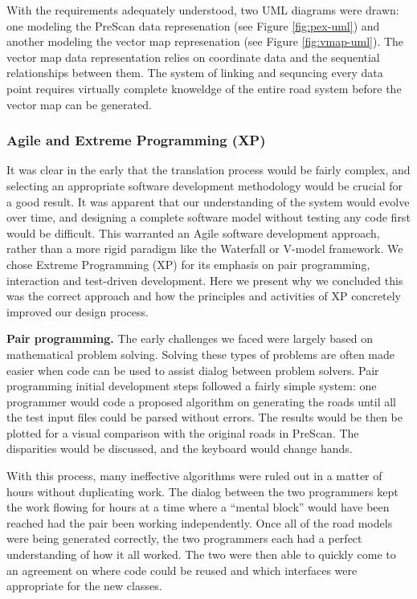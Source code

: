 \documentclass[12pt,twoside]{article}
\begin{document}
With the requirements adequately understood, two UML diagrams were drawn: one modeling the PreScan data represenation (see Figure \ref{fig:pex-uml}) and another modeling the vector map represenation (see Figure \ref{fig:vmap-uml}). The vector map data representation relies on coordinate data and the sequential relationships between them. The system of linking and sequncing every data point requires virtually complete knoweldge of the entire road system before the vector map can be generated.

\subsubsection{Agile and Extreme Programming (XP)}

It was clear in the early that the translation process would be fairly complex, and selecting an appropriate software development methodology would be crucial for a good result. It was apparent that our understanding of the system would evolve over time, and designing a complete software model without testing any code first would be difficult. This warranted an Agile software development approach, rather than a more rigid paradigm like the Waterfall or V-model framework. We chose Extreme Programming (XP) for its emphasis on pair programming, interaction and test-driven development. Here we present why we concluded this was the correct approach and how the principles and activities of XP concretely improved our design process.

\textbf{Pair programming.}
The early challenges we faced were largely based on mathematical problem solving. Solving these types of problems are often made easier when code can be used to assist dialog between problem solvers. Pair programming initial development steps followed a fairly simple system: one programmer would code a proposed algorithm on generating the roads until all the test input files could be parsed without errors. The results would be then be plotted for a visual comparison with the original roads in PreScan. The disparities would be discussed, and the keyboard would change hands.

With this process, many ineffective algorithms were ruled out in a matter of hours without duplicating work. The dialog between the two programmers kept the work flowing for hours at a time where a ``mental block'' would have been reached had the pair been working independently. Once all of the road models were being generated correctly, the two programmers each had a perfect understanding of how it all worked. The two were then able to quickly come to an agreement on where code could be reused and which interfaces were appropriate for the new classes.
\end{document}
